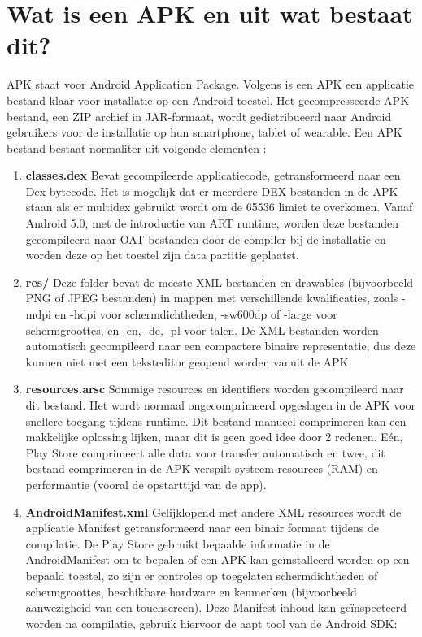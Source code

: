 \section{Wat is een APK en uit wat bestaat dit?}
APK staat voor Android Application Package. Volgens \textcite{PCMag} is een APK een applicatie bestand klaar voor installatie op een Android toestel. Het gecompresseerde APK bestand, een ZIP archief in JAR-formaat, wordt gedistribueerd naar Android gebruikers voor de installatie op hun smartphone, tablet of wearable. 
Een APK bestand bestaat normaliter uit volgende elementen : 
\begin{enumerate}
	\setlength\itemsep{2em}
\item \textbf{classes.dex} \newline
Bevat gecompileerde applicatiecode, getransformeerd naar een Dex bytecode. Het is mogelijk dat er meerdere DEX bestanden in de APK staan als er multidex gebruikt wordt om de 65536 limiet te overkomen. Vanaf Android 5.0, met de introductie van ART runtime, worden deze bestanden gecompileerd naar OAT bestanden door de compiler bij de installatie en worden deze op het toestel zijn data partitie geplaatst. 
\item \textbf{res/} \newline
Deze folder bevat de meeste XML bestanden en drawables (bijvoorbeeld PNG of JPEG bestanden) in mappen met verschillende kwalificaties, zoals -mdpi en -hdpi voor schermdichtheden, -sw600dp of -large voor schermgroottes, en -en, -de, -pl voor talen. De XML bestanden worden automatisch gecompileerd naar een compactere binaire representatie, dus deze kunnen niet met een teksteditor geopend worden vanuit de APK. 
\item \textbf{resources.arsc}\newline
Sommige resources en identifiers worden gecompileerd naar dit bestand. Het wordt normaal ongecomprimeerd opgeslagen in de APK voor snellere toegang tijdens runtime. Dit bestand manueel comprimeren kan een makkelijke oplossing lijken, maar dit is geen goed idee door 2 redenen. Eén, Play Store comprimeert alle data voor transfer automatisch en twee, dit bestand comprimeren in de APK verspilt systeem resources (RAM) en performantie (vooral de opstarttijd van de app).
\item \textbf{AndroidManifest.xml}\newline
Gelijklopend met andere XML resources wordt de applicatie Manifest getransformeerd naar een binair formaat tijdens de compilatie. De Play Store gebruikt bepaalde informatie in de AndroidManifest om te bepalen of een APK kan geïnstalleerd worden op een bepaald toestel, zo zijn er controles op toegelaten schermdichtheden of schermgroottes, beschikbare hardware en kenmerken (bijvoorbeeld aanwezigheid van een touchscreen). Deze Manifest inhoud kan geïnspecteerd worden na compilatie, gebruik hiervoor de aapt tool van de Android SDK: 

\end{enumerate}
